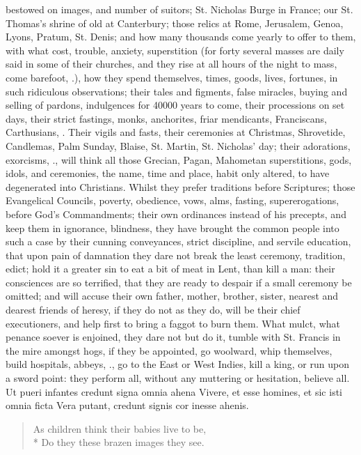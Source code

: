 {bestowed on images, and number of suitors; St. Nicholas Burge in
France; our St. Thomas's shrine of old at Canterbury; those relics at
Rome, Jerusalem, Genoa, Lyons, Pratum, St. Denis; and how many
thousands come yearly to offer to them, with what cost, trouble,
anxiety, superstition (for forty several masses are daily said in some
of their churches, and they rise at all hours of the night to
mass, come barefoot, \etc{}.), how they spend themselves, times, goods,
lives, fortunes, in such ridiculous observations; their tales and
figments, false miracles, buying and selling of pardons, indulgences
for 40\thinspace{}000 years to come, their processions on set days, their strict
fastings, monks, anchorites, friar mendicants, Franciscans,
Carthusians, \etc{}. Their vigils and fasts, their ceremonies at Christmas,
Shrovetide, Candlemas, Palm Sunday, Blaise, St. Martin, St. Nicholas'
day; their adorations, exorcisms, \etc{}., will think all those Grecian,
Pagan, Mahometan superstitions, gods, idols, and ceremonies, the name,
time and place, habit only altered, to have degenerated into
Christians. Whilst they prefer traditions before Scriptures; those
Evangelical Councils, poverty, obedience, vows, alms, fasting,
supererogations, before God's Commandments; their own ordinances
instead of his precepts, and keep them in ignorance, blindness, they
have brought the common people into such a case by their cunning
conveyances, strict discipline, and servile education, that upon pain
of damnation they dare not break the least ceremony, tradition, edict;
hold it a greater sin to eat a bit of meat in Lent, than kill a man:
their consciences are so terrified, that they are ready to despair if a
small ceremony be omitted; and will accuse their own father, mother,
brother, sister, nearest and dearest friends of heresy, if they do not
as they do, will be their chief executioners, and help first to bring a
faggot to burn them. What mulct, what penance soever is enjoined, they
dare not but do it, tumble with St. Francis in the mire amongst hogs,
if they be appointed, go woolward, whip themselves, build hospitals,
abbeys, \etc{}., go to the East or West Indies, kill a king, or run upon a
sword point: they perform all, without any muttering or hesitation,
believe all.
Ut pueri infantes credunt signa omnia ahena
Vivere, et esse homines, et sic isti omnia ficta
Vera putant, credunt signis cor inesse ahenis.

\begin{verse}
As children think their babies live to be,\\*
Do they these brazen images they see.
\end{verse}

}
